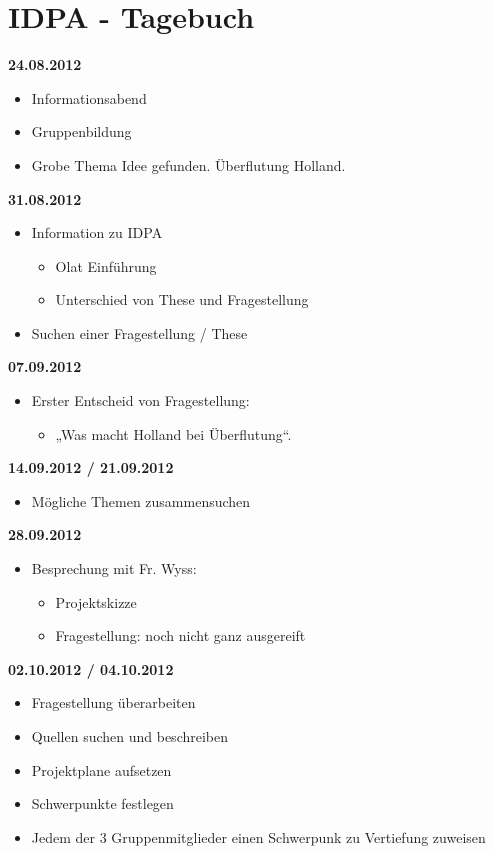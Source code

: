 \part{IDPA - Tagebuch}

\textbf{24.08.2012}
\begin{itemize}
	\item Informationsabend
	\item Gruppenbildung 
	\item Grobe Thema Idee gefunden. Überflutung Holland.
\end{itemize}
\textbf{31.08.2012} 
\begin{itemize}
 	\item Information zu IDPA
  	\begin{itemize}
  		\item Olat Einführung
  		\item Unterschied von These und Fragestellung
   \end{itemize}
   \item Suchen einer Fragestellung / These
\end{itemize}
\textbf{07.09.2012}
\begin{itemize}
 	\item Erster Entscheid von Fragestellung:
  	\begin{itemize}
  		\item „Was macht Holland bei Überflutung“.
   \end{itemize}
\end{itemize}
\textbf{14.09.2012 / 21.09.2012}
\begin{itemize}
 	\item Mögliche Themen zusammensuchen
\end{itemize}
\textbf{28.09.2012}
\begin{itemize}
 	\item Besprechung mit Fr. Wyss:
  	\begin{itemize}
  		\item Projektskizze
  		\item Fragestellung: noch nicht ganz ausgereift
   \end{itemize}
\end{itemize}
\textbf{02.10.2012 / 04.10.2012}
\begin{itemize}
 	\item Fragestellung überarbeiten
 	\item Quellen suchen und beschreiben
	\item Projektplane aufsetzen
	\item Schwerpunkte festlegen
	\item Jedem der 3 Gruppenmitglieder einen Schwerpunk zu Vertiefung zuweisen
\end{itemize}
